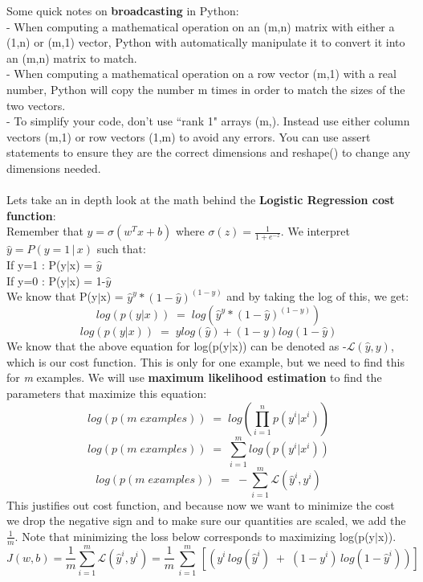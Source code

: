 \documentclass[11pt, a4paper]{article}
\begin{document}
\begin{spacing}{1.1}
	\noindent Some quick notes on \textbf{broadcasting} in Python: \vspace*{1mm} \\
	\hspace*{2mm} - When computing a mathematical operation on an (m,n) matrix with either a (1,n) or (m,1) vector, \hspace*{5mm} Python with automatically manipulate it to convert it into an (m,n) matrix to match. \vspace*{1mm} \\
	\hspace*{2mm} - When computing a mathematical operation on a row vector (m,1) with a real number, Python will \hspace*{5mm} copy the number m times in order to match the sizes of the two vectors. \vspace*{1mm} \\
	\hspace*{2mm} - To simplify your code, don't use ``rank 1" arrays (m,). Instead use either column vectors (m,1) or \hspace*{5mm} row vectors (1,m) to avoid any errors. You can use assert statements to ensure they are the correct \hspace*{5mm} dimensions and reshape() to change any dimensions needed. \\~\\
	Lets take an in depth look at the math behind the \textbf{Logistic Regression cost function}: \vspace*{1mm} \\
	Remember that $\hat{y} = \sigma(w^Tx+b)$ where $\sigma(z) = \frac{1}{1+e^{-z}}$. We interpret $\hat{y} = P(y=1\,|\,x)$ such that: \\
	\hspace*{3mm} If y=1 : P(y$|$x) = $\hat{y}$ \\
	\hspace*{3mm} If y=0 : P(y$|$x) = 1-$\hat{y}$ \vspace*{1mm}\\
	We know that P(y$|$x) = $\hat{y}^y*(1-\hat{y})^{(1-y)}$ and by taking the log of this, we get: $$ log(p(y|x))\; = \; log(\hat{y}^y*(1-\hat{y})^{(1-y)})$$ $$ log(p(y|x))\; = \; ylog(\hat{y})+ (1-y)log(1-\hat{y})$$ 
	We know that the above equation for log(p(y$|$x)) can be denoted as -$\mathcal{L}(\hat{y},y)$, which is our cost function. This is only for one example, but we need to find this for \textit{m} examples. We will use \textbf{maximum likelihood estimation} to find the parameters that maximize this equation: $$ log(p(m\; examples))\; = \; log(\prod_{i=1}^{n} p(y^i|x^i)) $$ $$ log(p(m\; examples))\; = \; \sum_{i=1}^m log(p(y^i|x^i)) $$ $$ log(p(m\; examples))\; = \; -\sum_{i=1}^m \mathcal{L}(\hat{y}^i,y^i) $$ This justifies out cost function, and because now we want to minimize the cost we drop the negative sign and to make sure our quantities are scaled, we add the $\frac{1}{m}$. Note that minimizing the loss below corresponds to maximizing log(p(y$|$x)).  $$ J(w,b) = \frac{1}{m} \sum_{i=1}^{m} \mathcal{L}(\hat{y}^i,y^i) = \frac{1}{m}\, \sum_{i=1}^{m}\, [(y^i\,log(\hat{y}^i) \; + \; (1-y^i)\,log(1-\hat{y}^i))] $$

\end{spacing}
\end{document}
